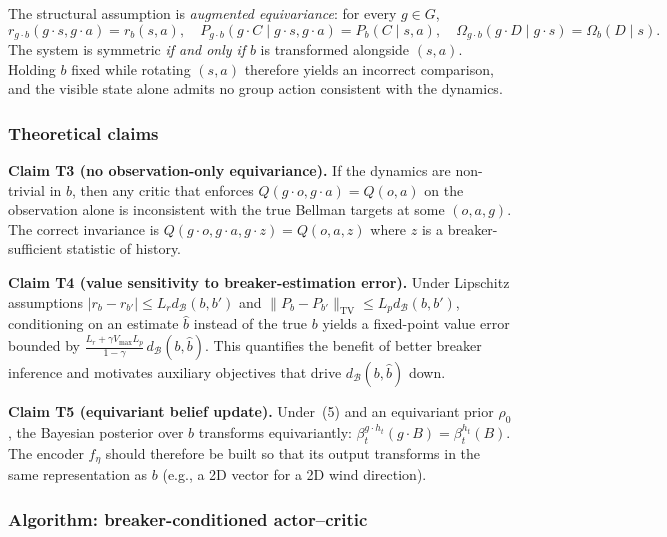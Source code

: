 \documentclass[11pt]{article}
\begin{document}
The structural assumption is \textit{augmented equivariance}: for every $g \in G$,
\begin{equation}
r_{g\cdot b}(g\!\cdot\!s, g\!\cdot\!a) = r_b(s,a), \quad
P_{g\cdot b}(g\!\cdot\!C \mid g\!\cdot\!s, g\!\cdot\!a) = P_b(C \mid s,a), \quad
\Omega_{g\cdot b}(g\!\cdot\!D \mid g\!\cdot\!s) = \Omega_b(D \mid s). \tag{5}
\end{equation}
The system is symmetric \textit{if and only if} $b$ is transformed alongside $(s,a)$.
Holding $b$ fixed while rotating $(s,a)$ therefore yields an incorrect
comparison, and the visible state alone admits no group action consistent with
the dynamics.

\subsubsection*{Theoretical claims}

\textbf{Claim T3 (no observation-only equivariance).} If the dynamics are
non-trivial in $b$, then any critic that enforces
$Q(g\!\cdot\!o, g\!\cdot\!a) = Q(o,a)$ on the observation alone is
inconsistent with the true Bellman targets at some $(o, a, g)$. The correct
invariance is $Q(g\!\cdot\!o, g\!\cdot\!a, g\!\cdot\!z) = Q(o, a, z)$
where $z$ is a breaker-sufficient statistic of history.

\textbf{Claim T4 (value sensitivity to breaker-estimation error).} Under
Lipschitz assumptions
$|r_b - r_{b'}| \le L_r d_\mathcal{B}(b, b')$ and
$\|P_b - P_{b'}\|_{\text{TV}} \le L_p d_\mathcal{B}(b, b')$,
conditioning on an estimate $\widehat{b}$ instead of the true $b$ yields a
fixed-point value error bounded by
$\tfrac{L_r + \gamma V_{\max} L_p}{1-\gamma}\,d_\mathcal{B}(b, \widehat{b}).$
This quantifies the benefit of better breaker inference and motivates
auxiliary objectives that drive $d_\mathcal{B}(b, \widehat{b})$ down.

\textbf{Claim T5 (equivariant belief update).} Under~(5) and an equivariant prior
$\rho_0$, the Bayesian posterior over $b$ transforms equivariantly:
$\beta^{g \cdot h_t}_t(g \cdot B) = \beta^{h_t}_t(B)$.
The encoder $f_\eta$ should therefore be built so that its output transforms
in the same representation as $b$ (e.g., a 2D vector for a 2D wind direction).

\subsubsection*{Algorithm: breaker-conditioned actor--critic}
\end{document}
